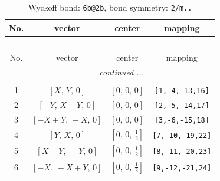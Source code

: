\documentclass[fleqn,8pt]{jsarticle}
\begin{document}
\begin{longtable}{cccc}
\caption{Wyckoff bond: {\tt 6b@2b}, bond symmetry: {\tt 2/m..}}
 \\
 \hline \hline
No. & vector & center & mapping \\ \hline \endfirsthead

\multicolumn{3}{l}{\tablename\ \thetable{}} \\
 \hline \hline
No. & vector & center & mapping \\ \hline \endhead

 \hline \hline
\multicolumn{3}{r}{\footnotesize\it continued ...} \\ \endfoot

 \hline \hline
\multicolumn{3}{r}{} \\ \endlastfoot

1 & $\left[ X,\, Y,\, 0 \right]$ & $\left[ 0,\, 0,\, 0 \right]$ & {\tt [1,-4,-13,16]} \\ \hline
2 & $\left[ - Y,\, X - Y,\, 0 \right]$ & $\left[ 0,\, 0,\, 0 \right]$ & {\tt [2,-5,-14,17]} \\ \hline
3 & $\left[ - X + Y,\, - X,\, 0 \right]$ & $\left[ 0,\, 0,\, 0 \right]$ & {\tt [3,-6,-15,18]} \\ \hline
4 & $\left[ Y,\, X,\, 0 \right]$ & $\left[ 0,\, 0,\, \frac{1}{2} \right]$ & {\tt [7,-10,-19,22]} \\ \hline
5 & $\left[ X - Y,\, - Y,\, 0 \right]$ & $\left[ 0,\, 0,\, \frac{1}{2} \right]$ & {\tt [8,-11,-20,23]} \\ \hline
6 & $\left[ - X,\, - X + Y,\, 0 \right]$ & $\left[ 0,\, 0,\, \frac{1}{2} \right]$ & {\tt [9,-12,-21,24]} \\
\end{longtable}
\renewcommand{\arraystretch}{1.2}
\end{document}
